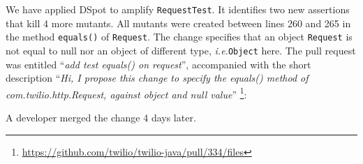 \documentclass[table,xcdraw,smallextended]{svjour3}
\newcommand{\ie}{\textit{i.e.}\xspace}
\newcommand{\dspot}{DSpot\xspace}
\begin{document}
We have applied \dspot to amplify \texttt{RequestTest}. It identifies two new assertions that kill 4 more mutants. All mutants were created between lines 260 and 265 in the method \texttt{equals()} of \texttt{Request}. The change specifies that an object \texttt{Request} is not equal to null nor an object of different type, \ie \texttt{Object} here. The pull request was entitled ``\emph{add test equals() on request}'', accompanied with the short description ``\emph{Hi, I propose this change to specify the equals() method of com.twilio.http.Request, against object and null value}'' \footnote{\url{https://github.com/twilio/twilio-java/pull/334/files}}:
\begin{figure}[H]
    \centering{}
\end{figure}

A developer merged the change 4 days later.
\end{document}
